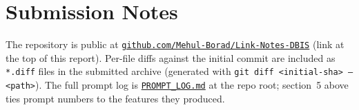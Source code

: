 \documentclass[11pt,a4paper]{article}
\begin{document}

\section{Submission Notes}

The repository is public at \href{https://github.com/Mehul-Borad/Link-Notes-DBIS}{\texttt{github.com/Mehul-Borad/Link-Notes-DBIS}} (link at the top of this report). Per-file diffs against the initial commit are included as \texttt{*.diff} files in the submitted archive (generated with \texttt{git diff <initial-sha> -- <path>}). The full prompt log is \href{PROMPT_LOG.md}{\texttt{PROMPT\_LOG.md}} at the repo root; section~5 above ties prompt numbers to the features they produced.
\end{document}

